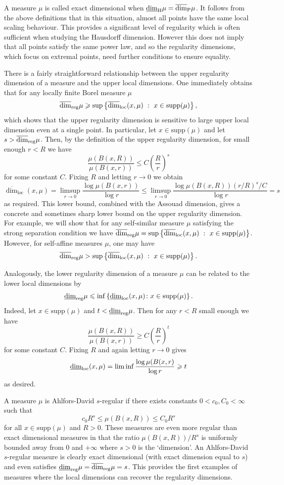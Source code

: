 A measure $\mu$ is called exact dimensional when $\underline{\dim}_{\text{H}} \mu=\overline{\dim}_{\text{P}} \mu$. It follows from the above definitions that in this situation, almost all points have the same local scaling behaviour. This provides a significant level of regularity which is often sufficient when studying the Hausdorff dimension. However this does not imply that all points satisfy the same power law, and so the regularity dimensions, which focus on extremal points, need further conditions to ensure equality.


There is a fairly straightforward relationship between the upper regularity dimension of a measure and the upper local dimensions. One immediately obtains that for any locally finite Borel measure $\mu$
\[
\overline{\dim}_{\textup{reg}} \mu \geqslant \sup \left\{ \overline{\dim}_{\text{loc}}(x,\mu) \ : \  x\in \text{supp}(\mu) \right\},
\]
which shows that the upper regularity dimension is sensitive to large upper local dimension even at a single point.  In particular, let $x \in \text{supp}(\mu)$ and let $s > \overline{\dim}_{\textup{reg}} \mu$.  Then, by the definition of the upper regularity dimension, for small enough $r < R$ we have
\[
\frac{\mu(B(x,R))}{\mu(B(x,r))} \leq C\left(\frac{R}{r}\right)^{s}
\]
for some constant $C$.  Fixing $R$ and letting $r \to 0$ we obtain
\[
\overline{\dim}_{\text{loc}}(x,\mu)=\limsup_{r\rightarrow 0} \frac{\log \mu(B(x,r))}{\log r} \leq  \limsup_{r\rightarrow 0} \frac{\log \mu(B(x,R)) (r/R)^s/C }{\log r}  = s
\]
as required. This lower bound, combined with the Assouad dimension, gives a concrete and sometimes sharp lower bound on the upper regularity dimension. For example, we will show that for any self-similar measure $\mu$ satisfying the strong separation condition we have $ \overline{\dim}_{\textup{reg}} \mu = \sup \left\{ \overline{\dim}_{\text{loc}}(x,\mu) \ : \  x\in \text{supp}(\mu) \right\}$.  However, for self-affine measures $\mu$, one may have
\[
\overline{\dim}_{\textup{reg}} \mu >  \sup \left\{ \overline{\dim}_{\text{loc}}(x,\mu) \ : \  x\in \text{supp}(\mu) \right\}.
\]

Analogously, the lower regularity dimension of a measure $\mu$ can be related to the lower local dimensions by 
\[
\underline{\dim}_{\textup{reg}} \mu \leqslant \inf \left\{\underline{\dim}_{\textup{loc}}(x,\mu) \colon x \in \text{supp}(\mu) \right\}.
\]
Indeed, let $x\in \text{supp}(\mu)$ and $t < \underline{\dim}_{\textup{reg}} \mu$. Then for any $r < R$ small enough we have
\[
\frac{\mu(B(x,R))}{\mu(B(x,r))} \geq C\left(\frac{R}{r}\right)^{t}
\]
for some constant $C$. Fixing $R$ and again letting $r \rightarrow 0$ gives
\[
\underline{\dim}_{\textup{loc}}(x,\mu) = \liminf \frac{\log \mu(B(x,r)}{\log r} \geqslant t
\]
as desired.

A measure $\mu$ is Ahlfors-David $s$-regular if there exists constants $0<c_0,C_0< \infty$ such that 
\[
c_0 R^s \le \mu(B(x,R)) \le C_0 R^s
\]
for all $x\in \text{supp}(\mu)$ and $R > 0$.
These measures are even more regular than exact dimensional measures in that the ratio $\mu(B(x,R))/R^s$ is uniformly bounded away from 0 and $+\infty$ where $s >0$ is the `dimension'.  An Ahlfors-David $s$-regular measure is clearly exact dimensional (with exact dimension equal to $s$) and even satisfies $\underline{\dim}_{\textup{reg}} \mu = \overline{\dim}_{\textup{reg}} \mu = s$. This provides the first examples of measures where the local dimensions can recover the regularity dimensions. 




